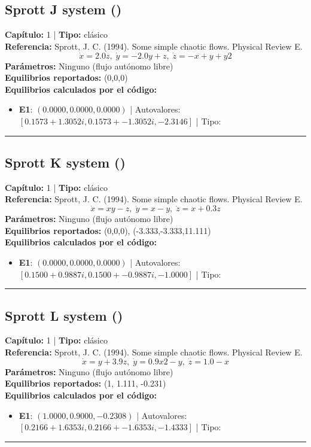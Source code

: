 \subsection*{Sprott J system ()}
\textbf{Capítulo:} 1 | \textbf{Tipo:} clásico\\
\textbf{Referencia:} Sprott, J. C. (1994). Some simple chaotic flows. Physical Review E.\\
\[\dot{x}=2.0z, \; \dot{y}=-2.0y+z, \; \dot{z}=-x+y+y2\]
\textbf{Parámetros:} Ninguno (flujo autónomo libre)\\
\textbf{Equilibrios reportados:} (0,0,0)\\
\textbf{Equilibrios calculados por el código:}
\begin{itemize}
  \item \textbf{E1}: $(0.0000, 0.0000, 0.0000)$ | Autovalores: $[0.1573 + 1.3052i, 0.1573 + -1.3052i, -2.3146]$ | Tipo: 
\end{itemize}
\hrule

\subsection*{Sprott K system ()}
\textbf{Capítulo:} 1 | \textbf{Tipo:} clásico\\
\textbf{Referencia:} Sprott, J. C. (1994). Some simple chaotic flows. Physical Review E.\\
\[\dot{x}=xy-z, \; \dot{y}=x-y, \; \dot{z}=x+0.3z\]
\textbf{Parámetros:} Ninguno (flujo autónomo libre)\\
\textbf{Equilibrios reportados:} (0,0,0), (-3.333,-3.333,11.111)\\
\textbf{Equilibrios calculados por el código:}
\begin{itemize}
  \item \textbf{E1}: $(0.0000, 0.0000, 0.0000)$ | Autovalores: $[0.1500 + 0.9887i, 0.1500 + -0.9887i, -1.0000]$ | Tipo: 
\end{itemize}
\hrule

\subsection*{Sprott L system ()}
\textbf{Capítulo:} 1 | \textbf{Tipo:} clásico\\
\textbf{Referencia:} Sprott, J. C. (1994). Some simple chaotic flows. Physical Review E.\\
\[\dot{x}=y+3.9z, \; \dot{y}=0.9x2-y, \; \dot{z}=1.0-x\]
\textbf{Parámetros:} Ninguno (flujo autónomo libre)\\
\textbf{Equilibrios reportados:} (1, 1.111, -0.231)\\
\textbf{Equilibrios calculados por el código:}
\begin{itemize}
  \item \textbf{E1}: $(1.0000, 0.9000, -0.2308)$ | Autovalores: $[0.2166 + 1.6353i, 0.2166 + -1.6353i, -1.4333]$ | Tipo: 
\end{itemize}
\hrule

